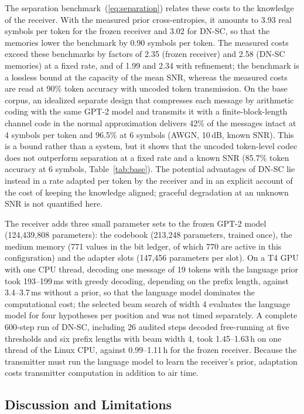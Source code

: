 The separation benchmark~(\ref{eq:separation}) relates these costs to the knowledge of the receiver. With the measured prior cross-entropies, it amounts to 3.93 real symbols per token for the frozen receiver and 3.02 for DN-SC, so that the memories lower the benchmark by 0.90 symbols per token. The measured costs exceed these benchmarks by factors of 2.35 (frozen receiver) and 2.58 (DN-SC memories) at a fixed rate, and of 1.99 and 2.34 with refinement; the benchmark is a lossless bound at the capacity of the mean SNR, whereas the measured costs are read at 90\% token accuracy with uncoded token transmission. On the base corpus, an idealized separate design that compresses each message by arithmetic coding with the same GPT-2 model and transmits it with a finite-block-length channel code in the normal approximation \cite{polyanskiy2010} delivers 42\% of the messages intact at 4 symbols per token and 96.5\% at 6 symbols (AWGN, 10\,dB, known SNR). This is a bound rather than a system, but it shows that the uncoded token-level codec does not outperform separation at a fixed rate and a known SNR (85.7\% token accuracy at 6 symbols, Table~\ref{tab:base}). The potential advantages of DN-SC lie instead in a rate adapted per token by the receiver and in an explicit account of the cost of keeping the knowledge aligned; graceful degradation at an unknown SNR is not quantified here.

The receiver adds three small parameter sets to the frozen GPT-2 model (124,439,808 parameters): the codebook (213,248 parameters, trained once), the medium memory (771 values in the bit ledger, of which 770 are active in this configuration) and the adapter slots (147,456 parameters per slot). On a T4 GPU with one CPU thread, decoding one message of 19 tokens with the language prior took 193--199\,ms with greedy decoding, depending on the prefix length, against 3.4--3.7\,ms without a prior, so that the language model dominates the computational cost; the selected beam search of width 4 evaluates the language model for four hypotheses per position and was not timed separately. A complete 600-step run of DN-SC, including 26 audited steps decoded free-running at five thresholds and six prefix lengths with beam width 4, took 1.45--1.63\,h on one thread of the Linux CPU, against 0.99--1.11\,h for the frozen receiver. Because the transmitter must run the language model to learn the receiver's prior, adaptation costs transmitter computation in addition to air time.

\subsection{Discussion and Limitations}
\label{sec:results-discussion}

